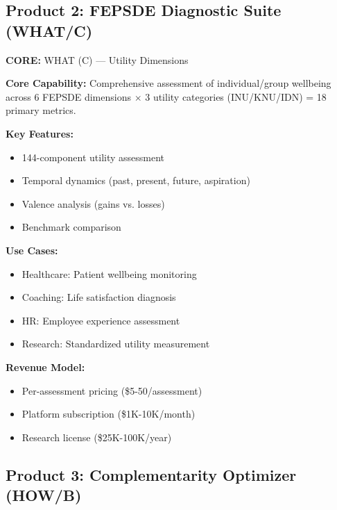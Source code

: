 \subsection{Product 2: FEPSDE Diagnostic Suite (WHAT/C)}

\begin{tcolorbox}[colback=orange!5!white, colframe=orange!75!black,
    title=Product: FEPSDE Diagnostic Suite]

\textbf{CORE:} WHAT (C) --- Utility Dimensions

\textbf{Core Capability:}
Comprehensive assessment of individual/group wellbeing across 6 FEPSDE dimensions $\times$ 3 utility categories (INU/KNU/IDN) = 18 primary metrics.

\textbf{Key Features:}
\begin{itemize}[nosep]
\item 144-component utility assessment
\item Temporal dynamics (past, present, future, aspiration)
\item Valence analysis (gains vs. losses)
\item Benchmark comparison
\end{itemize}

\textbf{Use Cases:}
\begin{itemize}[nosep]
\item Healthcare: Patient wellbeing monitoring
\item Coaching: Life satisfaction diagnosis
\item HR: Employee experience assessment
\item Research: Standardized utility measurement
\end{itemize}

\textbf{Revenue Model:}
\begin{itemize}[nosep]
\item Per-assessment pricing (\$5-50/assessment)
\item Platform subscription (\$1K-10K/month)
\item Research license (\$25K-100K/year)
\end{itemize}

\end{tcolorbox}


\subsection{Product 3: Complementarity Optimizer (HOW/B)}

